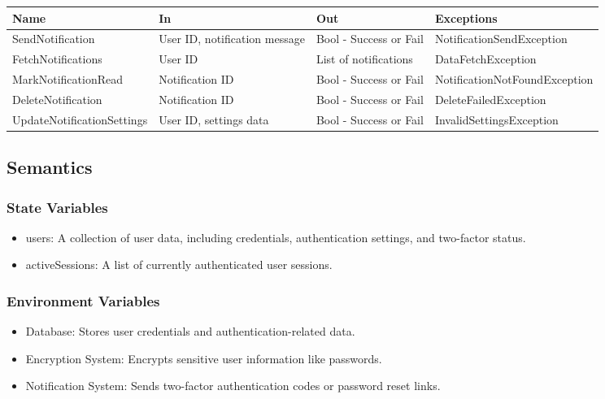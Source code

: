 \documentclass[12pt, titlepage]{article}
\begin{document}
\begin{center}
  \begin{tabular}{p{5cm} p{3cm} p{3cm} p{5cm}}
    \hline
    \textbf{Name}              & \textbf{In}                   & \textbf{Out}           & \textbf{Exceptions}           \\
    \hline
    SendNotification           & User ID, notification message & Bool - Success or Fail & NotificationSendException     \\
    \hline
    FetchNotifications         & User ID                       & List of notifications  & DataFetchException            \\
    \hline
    MarkNotificationRead       & Notification ID               & Bool - Success or Fail & NotificationNotFoundException \\
    \hline
    DeleteNotification         & Notification ID               & Bool - Success or Fail & DeleteFailedException         \\
    \hline
    UpdateNotificationSettings & User ID, settings data        & Bool - Success or Fail & InvalidSettingsException      \\
    \hline
  \end{tabular}
\end{center}

\subsection{Semantics}

\subsubsection{State Variables}

\begin{itemize}
  \item users: A collection of user data, including credentials, authentication settings, and two-factor status.
  \item activeSessions: A list of currently authenticated user sessions.
\end{itemize}

\subsubsection{Environment Variables}

\begin{itemize}
  \item Database: Stores user credentials and authentication-related data.
  \item Encryption System: Encrypts sensitive user information like passwords.
  \item Notification System: Sends two-factor authentication codes or password reset links.
\end{itemize}
\end{document}
